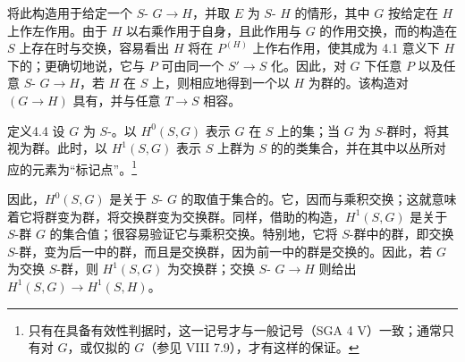 将此构造用于给定一个 $S$- $G\to H$，并取 $E$ 为 $S$- $H$ 的情形，其中 $G$ 按给定在 $H$ 上作左作用。由于 $H$ 以右乘作用于自身，且此作用与 $G$ 的作用交换，而的构造在 $S$ 上存在时与交换，容易看出 $H$ 将在 $P^{(H)}$ 上作右作用，使其成为 4.1 意义下 $H$ 下的；更确切地说，它与 $P$ 可由同一个 $S'\to S$ 化。因此，对 $G$ 下任意 $P$ 以及任意 $S$- $G\to H$，若 $H$ 在 $S$ 上，则相应地得到一个以 $H$ 为群的。该构造对 $(G\to H)$ 具有，并与任意 $T\to S$ 相容。

\begin{SGAresult}{定义}{4.4}
设 $G$ 为 $S$-。以 $H^0(S,G)$ 表示 $G$ 在 $S$ 上的集；当 $G$ 为 $S$-群时，将其视为群。此时，以 $H^1(S,G)$ 表示 $S$ 上群为 $S$ 的的类集合，并在其中以丛所对应的元素为“标记点”。\footnote{只有在具备有效性判据时，这一记号才与一般记号（SGA 4 V）一致；通常只有对 $G$，或仅拟的 $G$（参见 VIII 7.9），才有这样的保证。}
\end{SGAresult}
因此，$H^0(S,G)$ 是关于 $S$- $G$ 的取值于集合的。它，因而与乘积交换；这就意味着它将群变为群，将交换群变为交换群。同样，借助的构造，$H^1(S,G)$ 是关于 $S$-群 $G$ 的集合值；很容易验证它与乘积交换。特别地，它将 $S$-群中的群，即交换 $S$-群，变为后一中的群，而且是交换群，因为前一中的群是交换的。因此，若 $G$ 为交换 $S$-群，则 $H^1(S,G)$ 为交换群；交换 $S$- $G\to H$ 则给出 $H^1(S,G)\to H^1(S,H)$。

